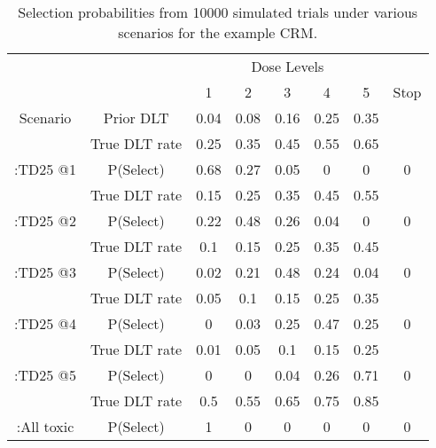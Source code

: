 \begin{table}[H]
	
	\caption{\label{tab_tite-dtp:InitialCRMsimsexample}Selection probabilities from 10000 simulated trials under various scenarios for the example CRM.}
	\centering
	\begin{tabular}[t]{cccccccc}
		\toprule
		\multicolumn{2}{c}{ } & \multicolumn{5}{c}{Dose Levels} \\
		\cmidrule(l{3pt}r{3pt}){3-7}
		&   & 1 & 2 & 3 & 4 & 5 & Stop\\
		\midrule
		Scenario & Prior DLT & 0.04 & 0.08 & 0.16 & 0.25 & 0.35 & \\
		\cmidrule{1-8}
		& True DLT rate & 0.25 & 0.35 & 0.45 & 0.55 & 0.65 & \\
		
		\multirow{-2}{*}{\centering\arraybackslash 1:TD25 @1} & P(Select) & 0.68 & 0.27 & 0.05 & 0 & 0 & 0\\
		\cmidrule{1-8}
		& True DLT rate & 0.15 & 0.25 & 0.35 & 0.45 & 0.55 & \\
		
		\multirow{-2}{*}{\centering\arraybackslash 2:TD25 @2} & P(Select) & 0.22 & 0.48 & 0.26 & 0.04 & 0 & 0\\
		\cmidrule{1-8}
		& True DLT rate & 0.1 & 0.15 & 0.25 & 0.35 & 0.45 & \\
		
		\multirow{-2}{*}{\centering\arraybackslash 3:TD25 @3} & P(Select) & 0.02 & 0.21 & 0.48 & 0.24 & 0.04 & 0\\
		\cmidrule{1-8}
		& True DLT rate & 0.05 & 0.1 & 0.15 & 0.25 & 0.35 & \\
		
		\multirow{-2}{*}{\centering\arraybackslash 4:TD25 @4} & P(Select) & 0 & 0.03 & 0.25 & 0.47 & 0.25 & 0\\
		\cmidrule{1-8}
		& True DLT rate & 0.01 & 0.05 & 0.1 & 0.15 & 0.25 & \\
		
		\multirow{-2}{*}{\centering\arraybackslash 5:TD25 @5} & P(Select) & 0 & 0 & 0.04 & 0.26 & 0.71 & 0\\
		\cmidrule{1-8}
		& True DLT rate & 0.5 & 0.55 & 0.65 & 0.75 & 0.85 & \\
		
		\multirow{-2}{*}{\centering\arraybackslash 6:All toxic} & P(Select) & 1 & 0 & 0 & 0 & 0 & 0\\
		\bottomrule
	\end{tabular}
\end{table}

